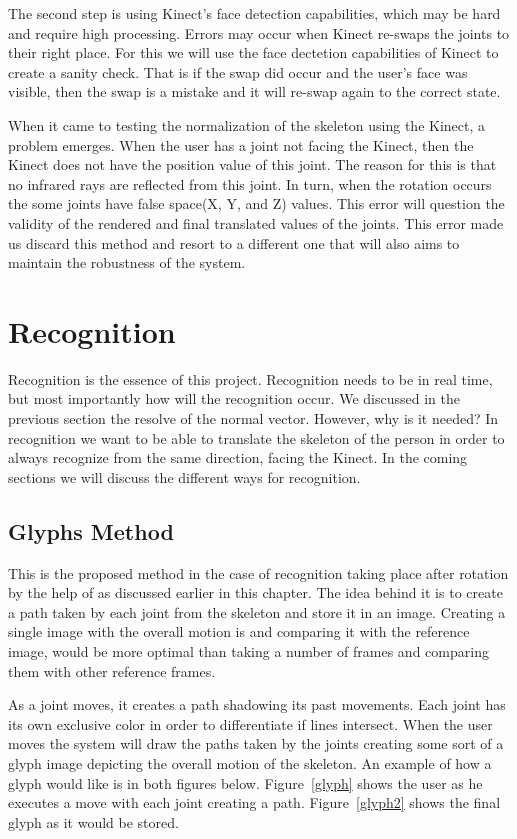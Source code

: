 The second step is using Kinect's face detection capabilities, which may be 
hard and require high processing. Errors may occur when Kinect re-swaps the joints to their right place. For this we will use the face dectetion capabilities of Kinect to create a sanity check. That is if the swap did occur and the user's face was visible, then the swap is a mistake and it will re-swap again to the correct state.

When it came to testing the normalization of the skeleton using the Kinect, a problem emerges. When the user has a joint not facing the Kinect, then the Kinect does not have the position value of this joint. The reason for this is that no infrared rays are reflected from this joint. In turn, when the rotation occurs the some joints have false space(X, Y, and Z) values. This error will question the validity of the rendered and final translated values of the joints. This error made us discard this method and resort to a different one that will also aims to maintain the robustness of the system.

\section{Recognition}
Recognition is the essence of this project. Recognition needs to be in real time, but most importantly how will the recognition occur. We discussed in the previous section the resolve of the normal vector. However, why is it needed? In recognition we want to be able to translate the skeleton of the person in order to always recognize from the same direction, facing the Kinect. In the coming sections we will discuss the different ways for recognition.

\subsection{Glyphs Method}
This is the proposed method in the case of recognition taking place after rotation by the help of \N as discussed earlier in this chapter. The idea behind it is to create a path taken by each joint from the skeleton and store it in an image. Creating a single image with the overall motion is and comparing it with the reference image, would be more optimal than taking a number of frames and comparing them with other reference frames.

As a joint moves, it creates a path shadowing its past movements. Each joint has its own exclusive color in order to differentiate if lines intersect. When the user moves the system will draw the paths taken by the joints creating some sort of a glyph image depicting the overall motion of the skeleton. An example of how a glyph would like is in both figures below. Figure~\ref{glyph} shows the user as he executes a move with each joint creating a path. Figure~\ref{glyph2} shows the final glyph as it would be stored.

